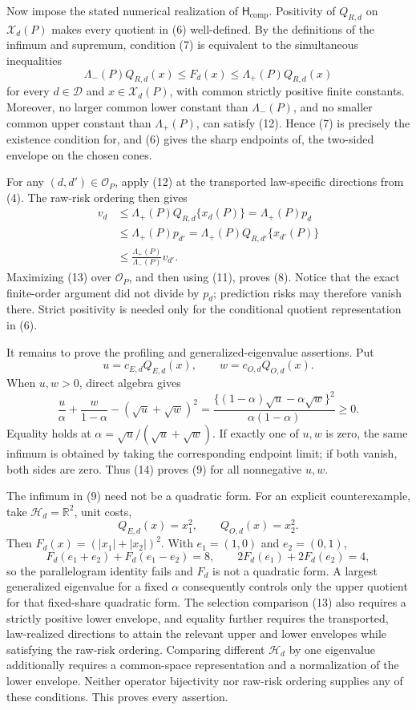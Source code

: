 Now impose the stated numerical realization of \(\mathsf H_{\mathrm{comp}}\).  Positivity of \(Q_{R,d}\) on \(\mathcal X_d(P)\) makes every quotient in (6) well-defined.  By the definitions of the infimum and supremum, condition (7) is equivalent to the simultaneous inequalities
\[
 \Lambda_-(P)Q_{R,d}(x)
 \le F_d(x)
 \le \Lambda_+(P)Q_{R,d}(x)                                \tag{12}
\]
for every \(d\in\mathcal D\) and \(x\in\mathcal X_d(P)\), with common strictly positive finite constants.  Moreover, no larger common lower constant than \(\Lambda_-(P)\), and no smaller common upper constant than \(\Lambda_+(P)\), can satisfy (12).  Hence (7) is precisely the existence condition for, and (6) gives the sharp endpoints of, the two-sided envelope on the chosen cones.

For any \((d,d')\in\mathcal O_P\), apply (12) at the transported law-specific directions from (4).  The raw-risk ordering then gives
\[
\begin{aligned}
 v_d
 &\le \Lambda_+(P)Q_{R,d}\{x_d(P)\}
   =\Lambda_+(P)p_d\\
 &\le \Lambda_+(P)p_{d'}
   =\Lambda_+(P)Q_{R,d'}\{x_{d'}(P)\}\\
 &\le \frac{\Lambda_+(P)}{\Lambda_-(P)}v_{d'}.
\end{aligned}                                                \tag{13}
\]
Maximizing (13) over \(\mathcal O_P\), and then using (11), proves (8).  Notice that the exact finite-order argument did not divide by \(p_d\); prediction risks may therefore vanish there.  Strict positivity is needed only for the conditional quotient representation in (6).

It remains to prove the profiling and generalized-eigenvalue assertions.  Put
\[
 u=c_{E,d}Q_{E,d}(x),\qquad w=c_{O,d}Q_{O,d}(x).
\]
When \(u,w>0\), direct algebra gives
\[
 \frac{u}{\alpha}+\frac{w}{1-\alpha}
 -(\sqrt u+\sqrt w)^2
 =\frac{\{(1-\alpha)\sqrt u-\alpha\sqrt w\}^{2}}
        {\alpha(1-\alpha)}\ge0.                             \tag{14}
\]
Equality holds at \(\alpha=\sqrt u/(\sqrt u+\sqrt w)\).  If exactly one of \(u,w\) is zero, the same infimum is obtained by taking the corresponding endpoint limit; if both vanish, both sides are zero.  Thus (14) proves (9) for all nonnegative \(u,w\).

The infimum in (9) need not be a quadratic form.  For an explicit counterexample, take \(\mathcal H_d=\mathbb R^2\), unit costs,
\[
 Q_{E,d}(x)=x_1^2,
 \qquad Q_{O,d}(x)=x_2^2.
\]
Then \(F_d(x)=(|x_1|+|x_2|)^2\).  With \(e_1=(1,0)\) and \(e_2=(0,1)\),
\[
 F_d(e_1+e_2)+F_d(e_1-e_2)=8,
 \qquad
 2F_d(e_1)+2F_d(e_2)=4,
\]
so the parallelogram identity fails and \(F_d\) is not a quadratic form.  A largest generalized eigenvalue for a fixed \(\alpha\) consequently controls only the upper quotient for that fixed-share quadratic form.  The selection comparison (13) also requires a strictly positive lower envelope, and equality further requires the transported, law-realized directions to attain the relevant upper and lower envelopes while satisfying the raw-risk ordering.  Comparing different \(\mathcal H_d\) by one eigenvalue additionally requires a common-space representation and a normalization of the lower envelope.  Neither operator bijectivity nor raw-risk ordering supplies any of these conditions.  This proves every assertion.